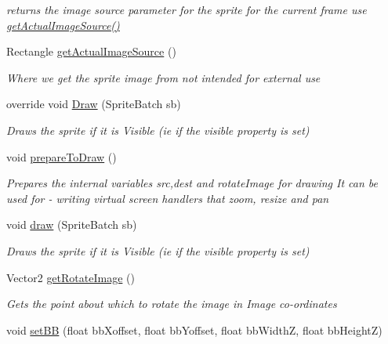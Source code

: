 \begin{DoxyCompactItemize}
\begin{DoxyCompactList}\small\item\em returns the image source parameter for the sprite for the current frame use \mbox{\hyperlink{class_r_c___framework_1_1_sprite3_a376a1cca122797eb306bc81d31e91551}{get\+Actual\+Image\+Source()}} \end{DoxyCompactList}\item 
Rectangle \mbox{\hyperlink{class_r_c___framework_1_1_sprite3_a376a1cca122797eb306bc81d31e91551}{get\+Actual\+Image\+Source}} ()
\begin{DoxyCompactList}\small\item\em Where we get the sprite image from not intended for external use \end{DoxyCompactList}\item 
override void \mbox{\hyperlink{class_r_c___framework_1_1_sprite3_a79b8e18ee29cd62719307a059e4cb6df}{Draw}} (Sprite\+Batch sb)
\begin{DoxyCompactList}\small\item\em Draws the sprite if it is Visible (ie if the visible property is set) \end{DoxyCompactList}\item 
void \mbox{\hyperlink{class_r_c___framework_1_1_sprite3_afc737761beac47c71402bea9f5cc0b2a}{prepare\+To\+Draw}} ()
\begin{DoxyCompactList}\small\item\em Prepares the internal variables src,dest and rotate\+Image for drawing It can be used for -\/ writing virtual screen handlers that zoom, resize and pan \end{DoxyCompactList}\item 
void \mbox{\hyperlink{class_r_c___framework_1_1_sprite3_a4a9fc342f033b500edb18fbf9b921879}{draw}} (Sprite\+Batch sb)
\begin{DoxyCompactList}\small\item\em Draws the sprite if it is Visible (ie if the visible property is set) \end{DoxyCompactList}\item 
Vector2 \mbox{\hyperlink{class_r_c___framework_1_1_sprite3_aae022ecd2e51d1ad3654854b8594494f}{get\+Rotate\+Image}} ()
\begin{DoxyCompactList}\small\item\em Gets the point about which to rotate the image in Image co-\/ordinates \end{DoxyCompactList}\item 
void \mbox{\hyperlink{class_r_c___framework_1_1_sprite3_a0901ebb278e50e5244e4b7f0fbd57242}{set\+BB}} (float bb\+Xoffset, float bb\+Yoffset, float bb\+WidthZ, float bb\+HeightZ)

\end{DoxyCompactItemize}
